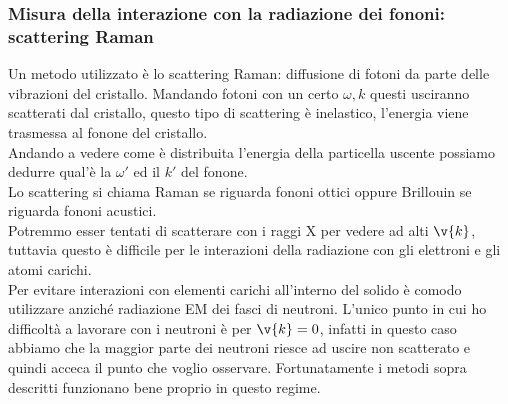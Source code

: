 \subsubsection{Misura della interazione con la radiazione dei fononi: scattering Raman}
\label{subsubsec:Misura della interazione con la radiazione dei fononi}
Un metodo utilizzato è lo scattering Raman: diffusione di fotoni da parte delle vibrazioni del cristallo. 
Mandando fotoni con un certo $\omega , k$ questi usciranno scatterati dal cristallo, questo tipo di scattering è inelastico, l'energia viene trasmessa al fonone del cristallo.\\
Andando a vedere come è distribuita l'energia della particella uscente possiamo dedurre qual'è la $\omega '$ ed il $k'$ del fonone.\\
Lo scattering si chiama Raman se riguarda fononi ottici oppure Brillouin se riguarda fononi acustici.\\
Potremmo esser tentati di scatterare con i raggi X per vedere ad alti $\v{k}$, tuttavia questo è difficile per le interazioni della radiazione con gli elettroni e gli atomi carichi.\\
Per evitare interazioni con elementi carichi all'interno del solido è comodo utilizzare anziché radiazione EM dei fasci di neutroni. L'unico punto in cui ho difficoltà a lavorare con i neutroni è per $\v{k}=0$, infatti in questo caso abbiamo che la maggior parte dei neutroni riesce ad uscire non scatterato e quindi acceca il punto che voglio osservare. Fortunatamente i metodi sopra descritti funzionano bene proprio in questo regime.

